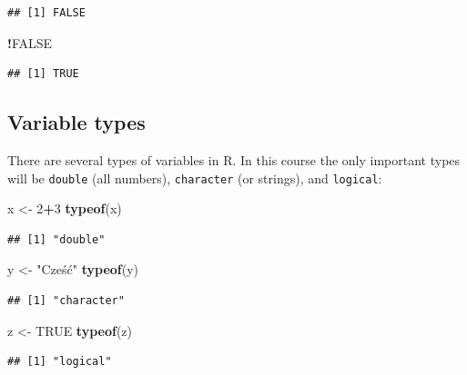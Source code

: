 \documentclass[
]{book}
\newenvironment{Shaded}{\begin{snugshade}}{\end{snugshade}}
\newcommand{\DecValTok}[1]{\textcolor[rgb]{0.00,0.00,0.81}{#1}}
\newcommand{\KeywordTok}[1]{\textcolor[rgb]{0.13,0.29,0.53}{\textbf{#1}}}
\newcommand{\NormalTok}[1]{#1}
\newcommand{\OperatorTok}[1]{\textcolor[rgb]{0.81,0.36,0.00}{\textbf{#1}}}
\newcommand{\OtherTok}[1]{\textcolor[rgb]{0.56,0.35,0.01}{#1}}
\newcommand{\StringTok}[1]{\textcolor[rgb]{0.31,0.60,0.02}{#1}}
\begin{document}
\begin{verbatim}
## [1] FALSE
\end{verbatim}

\begin{Shaded}
\begin{Highlighting}[]
\OperatorTok{!}\OtherTok{FALSE}
\end{Highlighting}
\end{Shaded}

\begin{verbatim}
## [1] TRUE
\end{verbatim}

\hypertarget{variable-types}{%
\subsection{Variable types}\label{variable-types}}

There are several types of variables in R. In this course the only important types will be \texttt{double} (all numbers), \texttt{character} (or strings), and \texttt{logical}:

\begin{Shaded}
\begin{Highlighting}[]
\NormalTok{x <-}\StringTok{ }\DecValTok{2}\OperatorTok{+}\DecValTok{3}
\KeywordTok{typeof}\NormalTok{(x)}
\end{Highlighting}
\end{Shaded}

\begin{verbatim}
## [1] "double"
\end{verbatim}

\begin{Shaded}
\begin{Highlighting}[]
\NormalTok{y <-}\StringTok{ "Cześć"}
\KeywordTok{typeof}\NormalTok{(y)}
\end{Highlighting}
\end{Shaded}

\begin{verbatim}
## [1] "character"
\end{verbatim}

\begin{Shaded}
\begin{Highlighting}[]
\NormalTok{z <-}\StringTok{ }\OtherTok{TRUE}
\KeywordTok{typeof}\NormalTok{(z)}
\end{Highlighting}
\end{Shaded}

\begin{verbatim}
## [1] "logical"
\end{verbatim}
\end{document}
